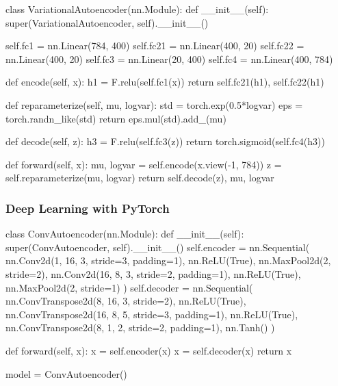 \documentclass{beamer}
\begin{document}
\begin{frame}%
    \begin{pythoncode}
class VariationalAutoencoder(nn.Module):
    def __init__(self):
        super(VariationalAutoencoder, self).__init__()

        self.fc1  = nn.Linear(784, 400)
        self.fc21 = nn.Linear(400, 20)
        self.fc22 = nn.Linear(400, 20)
        self.fc3  = nn.Linear(20, 400)
        self.fc4  = nn.Linear(400, 784)

    def encode(self, x):
        h1 = F.relu(self.fc1(x))
        return self.fc21(h1), self.fc22(h1)

    def reparameterize(self, mu, logvar):
        std = torch.exp(0.5*logvar)
        eps = torch.randn_like(std)
        return eps.mul(std).add_(mu)

    def decode(self, z):
        h3 = F.relu(self.fc3(z))
        return torch.sigmoid(self.fc4(h3))

    def forward(self, x):
        mu, logvar = self.encode(x.view(-1, 784))
        z = self.reparameterize(mu, logvar)
        return self.decode(z), mu, logvar
    \end{pythoncode}
\end{frame}

\begin{frame}[fragile]\frametitle{Deep Learning with PyTorch} 
    \begin{pythoncode}
    class ConvAutoencoder(nn.Module):
        def __init__(self):
            super(ConvAutoencoder, self).__init__()
            self.encoder = nn.Sequential(
                nn.Conv2d(1, 16, 3, stride=3, padding=1),
                nn.ReLU(True),
                nn.MaxPool2d(2, stride=2),
                nn.Conv2d(16, 8, 3, stride=2, padding=1),
                nn.ReLU(True),
                nn.MaxPool2d(2, stride=1)
            )
            self.decoder = nn.Sequential(
                nn.ConvTranspose2d(8, 16, 3, stride=2),
                nn.ReLU(True),
                nn.ConvTranspose2d(16, 8, 5, stride=3, padding=1),
                nn.ReLU(True),
                nn.ConvTranspose2d(8, 1, 2, stride=2, padding=1),
                nn.Tanh()
            )

        def forward(self, x):
            x = self.encoder(x)
            x = self.decoder(x)
            return x
    \end{pythoncode}
    model = ConvAutoencoder()
\end{frame}
\end{document}
